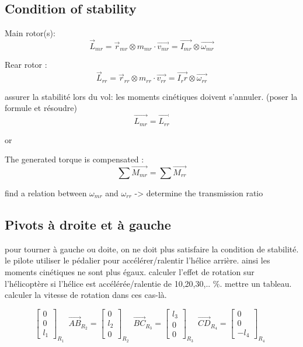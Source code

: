 \documentclass[12pt,a4paper]{article}
\begin{document}
\subsection{Condition of stability}

Main rotor(s):
\begin{equation}
\vec{L}_{mr}=\vec{r}_{mr} \otimes m_{mr} \cdot \vec{v_{mr}}=\vec{I_{mr}} \otimes \vec{\omega_{mr}}
\end{equation}


Rear rotor : 
\begin{equation}
\vec{L}_{rr}=\vec{r}_{rr} \otimes m_{rr} \cdot \vec{v_{rr}}=\vec{I_rr} \otimes \vec{\omega_{rr}}
\end{equation}

assurer la stabilité lors du vol: les moments cinétiques doivent s'annuler. (poser la formule et résoudre)
\begin{equation}
\vec{L_{mr}}=\vec{L_{rr}}
\end{equation}

or

The generated torque is compensated : 
\begin{equation}
\sum \vec{M_{mr}}=\sum \vec{M_{rr}}
\end{equation}

find a relation between $\omega_{mr}$ and $\omega_{rr}$ -> determine the transmission ratio

\subsection{Pivots à droite et à gauche}
pour tourner à gauche ou doite, on ne doit plus satisfaire la condition de stabilité. le pilote utiliser le pédalier pour accélérer/ralentir l'hélice arrière. ainsi les moments cinétiques ne sont plus égaux.
\medbreak
calculer l'effet de rotation sur l'hélicoptère si l'hélice est accélérée/ralentie de 10,20,30,.. $\%$. mettre un tableau. calculer la vitesse de rotation dans ces cas-là. 


\begin{equation}
\begin{bmatrix}
0 \\
0\\
l_1
\end{bmatrix}_{R_{1}} \enspace
\vec{AB}_{R_{2}}=
\begin{bmatrix}
0 \\
l_2\\
0
\end{bmatrix}_{R_{2}} \enspace
\vec{BC}_{R_{3}}=
\begin{bmatrix}
l_3 \\
0\\
0
\end{bmatrix}_{R_{3}} \enspace
\vec{CD}_{R_{4}}=
\begin{bmatrix}
0 \\
0\\
-l_4
\end{bmatrix}_{R_{4}} \enspace
\end{equation}
\end{document}
